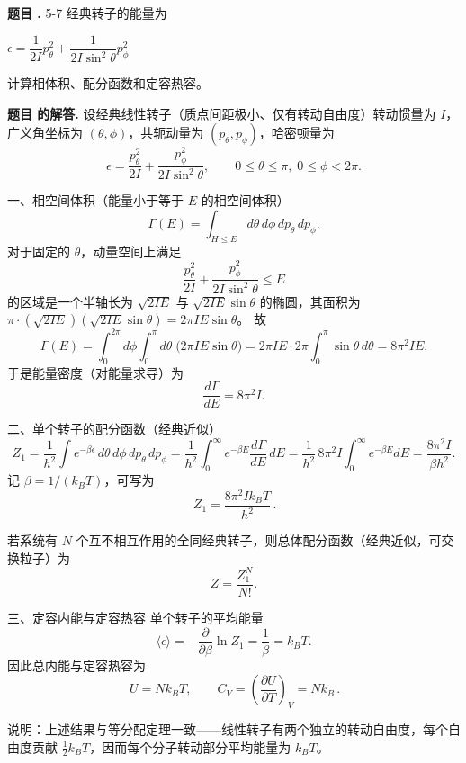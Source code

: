 \documentclass[12pt, a4paper, oneside]{ctexart}
\newcounter{problemname}
\newenvironment{problem}
  {\begin{shaded}\stepcounter{problemname}\par\noindent\textbf{题目 \theproblemname. }}
  {\end{shaded}\par}
\newenvironment{solution}
  {\par\noindent\textbf{题目 \theproblemname 的解答. }}
  {\par}
\begin{document}
\begin{problem}{5-7}
  经典转子的能量为

  \centerline{$\epsilon = \dfrac{1}{2 I} p_{\theta}^2 + \dfrac{1}{2 I \sin^2 \theta} p_{\phi}^2$}

  计算相体积、配分函数和定容热容。
\end{problem}

\begin{solution}
  设经典线性转子（质点间距极小、仅有转动自由度）转动惯量为 \(I\)，广义角坐标为 \((\theta,\phi)\)，共轭动量为 \((p_\theta,p_\phi)\)，哈密顿量为
\[
\epsilon=\frac{p_\theta^2}{2I}+\frac{p_\phi^2}{2I\sin^2\theta},\qquad
0\le\theta\le\pi,\;0\le\phi<2\pi.
\]

一、相空间体积（能量小于等于 \(E\) 的相空间体积）
\[
\Gamma(E)=\int_{H\le E} d\theta\,d\phi\,dp_\theta\,dp_\phi.
\]
对于固定的 \(\theta\)，动量空间上满足
\[
\frac{p_\theta^2}{2I}+\frac{p_\phi^2}{2I\sin^2\theta}\le E
\]
的区域是一个半轴长为 \(\sqrt{2I E}\) 与 \(\sqrt{2I E}\sin\theta\) 的椭圆，其面积为
\(\pi\cdot( \sqrt{2IE})(\sqrt{2IE}\sin\theta)=2\pi I E\sin\theta\)。
故
\[
\Gamma(E)=\int_0^{2\pi}d\phi\int_0^\pi d\theta\; \big(2\pi I E\sin\theta\big)
=2\pi I E\cdot 2\pi\int_0^\pi \sin\theta\,d\theta
=8\pi^2 I E.
\]
于是能量密度（对能量求导）为
\[
\frac{d\Gamma}{dE}=8\pi^2 I.
\]

二、单个转子的配分函数（经典近似）
\[
Z_1=\frac{1}{h^2}\int e^{-\beta\epsilon}\,d\theta\,d\phi\,dp_\theta\,dp_\phi
=\frac{1}{h^2}\int_0^\infty e^{-\beta E}\frac{d\Gamma}{dE}\,dE
=\frac{1}{h^2}\,8\pi^2 I\int_0^\infty e^{-\beta E}dE
=\frac{8\pi^2 I}{\beta h^2}.
\]
记 \(\beta=1/(k_B T)\)，可写为
\[
\boxed{\,Z_1=\dfrac{8\pi^2 I k_B T}{h^2}\, }.
\]

若系统有 \(N\) 个互不相互作用的全同经典转子，则总体配分函数（经典近似，可交换粒子）为
\[
Z=\frac{Z_1^N}{N!}.
\]

三、定容内能与定容热容
单个转子的平均能量
\[
\langle\epsilon\rangle
=-\frac{\partial}{\partial\beta}\ln Z_1
=\frac{1}{\beta}=k_B T.
\]
因此总内能与定容热容为
\[
\boxed{\,U=N k_B T,\qquad C_V=\left(\frac{\partial U}{\partial T}\right)_V
= N k_B\, }.
\]

说明：上述结果与等分配定理一致——线性转子有两个独立的转动自由度，每个自由度贡献 \(\tfrac12k_B T\)，因而每个分子转动部分平均能量为 \(k_B T\)。
\end{solution}
\end{document}
